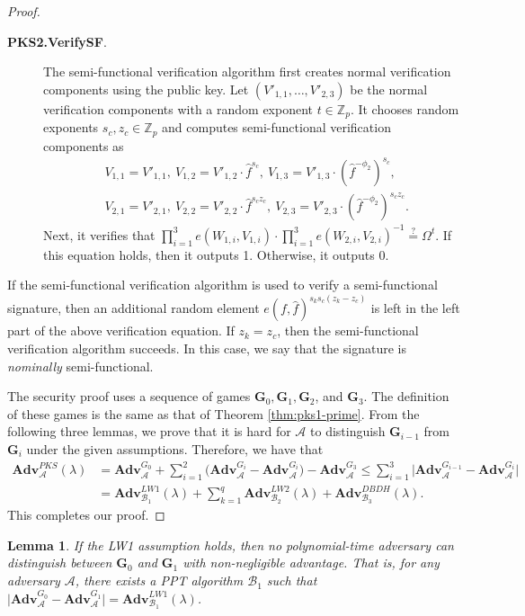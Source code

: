 \documentclass[11pt,letterpaper]{article}
\newtheorem{lemma}[theorem]{Lemma}
\newcommand{\Z}{\mathbb{Z}}
\newcommand{\Adv}{\textbf{Adv}}
\newcommand{\mc}[1]{\mathcal{#1}}
\newcommand{\tb}[1]{\textbf{#1}}
\begin{document}
\begin{proof}
\begin{description}
\item [\tb{PKS2.VerifySF}.] The semi-functional verification algorithm
    first creates normal verification components using the public key. Let
    $(V'_{1,1}, \ldots, V'_{2,3})$ be the normal verification components
    with a random exponent $t \in \Z_p$. It chooses random exponents $s_c,
    z_c \in \Z_p$ and computes semi-functional verification components as
    \begin{align*}
    &   V_{1,1} = V'_{1,1},~
        V_{1,2} = V'_{1,2} \cdot \hat{f}^{s_c},~
        V_{1,3} = V'_{1,3} \cdot (\hat{f}^{-\phi_2})^{s_c}, \\
    &   V_{2,1} = V'_{2,1},~
        V_{2,2} = V'_{2,2} \cdot \hat{f}^{s_c z_c},~
        V_{2,3} = V'_{2,3} \cdot (\hat{f}^{-\phi_2})^{s_c z_c}.
    \end{align*}
    Next, it verifies that $\prod_{i=1}^3 e(W_{1,i}, V_{1,i}) \cdot
    \prod_{i=1}^3 e(W_{2,i}, V_{2,i})^{-1} \stackrel{?}{=} \Omega^t$. If
    this equation holds, then it outputs 1. Otherwise, it outputs 0.
\end{description}
If the semi-functional verification algorithm is used to verify a
semi-functional signature, then an additional random element $e(f,
\hat{f})^{s_k s_c (z_k - z_c)}$ is left in the left part of the above
verification equation. If $z_k = z_c$, then the semi-functional verification
algorithm succeeds. In this case, we say that the signature is
\textit{nominally} semi-functional.

The security proof uses a sequence of games $\tb{G}_0, \tb{G}_1, \tb{G}_2$,
and $\tb{G}_3$. The definition of these games is the same as that of Theorem
\ref{thm:pks1-prime}.
From the following three lemmas, we prove that it is hard for $\mc{A}$ to
distinguish $\tb{G}_{i-1}$ from $\tb{G}_{i}$ under the given assumptions.
Therefore, we have that
    \begin{align*}
    \Adv_{\mc{A}}^{PKS}(\lambda)
    & = \Adv_{\mc{A}}^{G_0} +
        \sum_{i=1}^2 \big( \Adv_{\mc{A}}^{G_i} - \Adv_{\mc{A}}^{G_i} \big)
        - \Adv_{\mc{A}}^{G_3}
    \leq \sum_{i=1}^3 \big| \Adv_{\mc{A}}^{G_{i-1}} - \Adv_{\mc{A}}^{G_i} \big| \\
    & = \Adv_{\mc{B}_1}^{LW1}(\lambda) +
        \sum_{k=1}^q \Adv_{\mc{B}_2}^{LW2}(\lambda) +
        \Adv_{\mc{B}_3}^{DBDH}(\lambda).
    \end{align*}
This completes our proof.
\end{proof}

\begin{lemma} \label{lem:pks2-prime-1}
If the LW1 assumption holds, then no polynomial-time adversary can
distinguish between $\tb{G}_0$ and $\tb{G}_1$ with non-negligible advantage.
That is, for any adversary $\mc{A}$, there exists a PPT algorithm $\mc{B}_1$
such that
    $\big| \Adv_{\mc{A}}^{G_0} - \Adv_{\mc{A}}^{G_1} \big|
    = \Adv_{\mc{B}_1}^{LW1}(\lambda)$.
\end{lemma}
\end{document}
